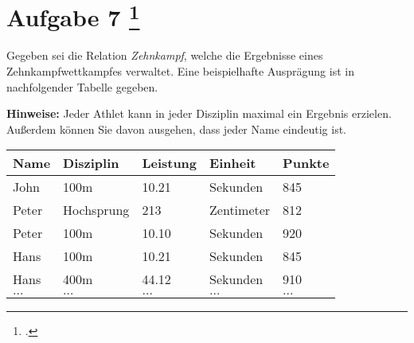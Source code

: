 \documentclass{lehramt-informatik-aufgabe}
\begin{document}
\let\FA=\liFunktionaleAbhaengigkeiten

\section{Aufgabe 7
\footcite{66116:2020:03}}

Gegeben sei die Relation \emph{Zehnkampf}, welche die Ergebnisse eines
Zehnkampfwettkampfes verwaltet. Eine beispielhafte Ausprägung ist in
nachfolgender Tabelle gegeben.

\textbf{Hinweise:} Jeder Athlet kann in jeder Disziplin maximal ein
Ergebnis erzielen. Außerdem können Sie davon ausgehen, dass jeder Name
eindeutig ist.

\begin{center}
\begin{tabular}{|l|l|l|l|l|}
\hline
Name    & Disziplin  & Leistung & Einheit    & Punkte \\\hline
John    & 100m       & 10.21    & Sekunden   & 845 \\
Peter   & Hochsprung & 213      & Zentimeter & 812 \\
Peter   & 100m       & 10.10    & Sekunden   & 920 \\
Hans    & 100m       & 10.21    & Sekunden   & 845 \\
Hans    & 400m       & 44.12    & Sekunden   & 910 \\
$\dots$ & $\dots$    & $\dots$  & $\dots$    & $\dots$ \\
\end{tabular}
\end{center}
\end{document}
